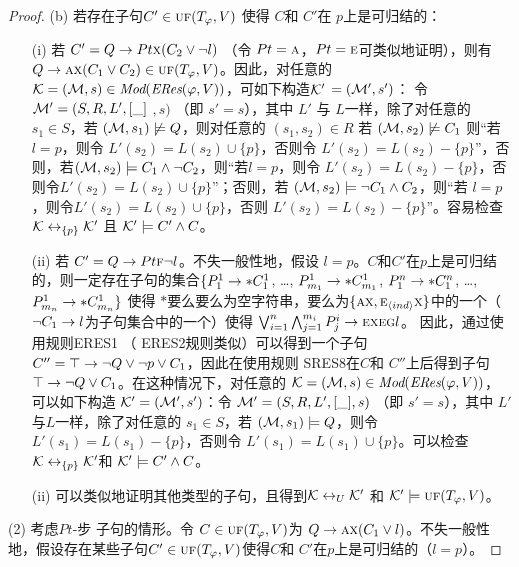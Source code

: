 \begin{proof}
	(b) 若存在子句$C'\in \textsc{uf}(T_\varphi,V)$ 使得 $C$和 $C'$在 $p$上是可归结的：
	\begin{itemize}
		\item[(i)] 若 $C'= Q\rightarrow Pt \textsc{x} (C_2 \vee \neg l)$ （令 $Pt=\textsc{a}$，$Pt = \textsc{e}$可类似地证明），则有$Q\rightarrow \textsc{a} \textsc{x}(C_1 \vee C_2) \in \textsc{uf}(T_\varphi,V)$。因此，对任意的 ${\cal K}=({\cal M}, s)\in \textit{Mod}(\emph{ERes}(\varphi,V))$，可如下构造${\cal K}'$ $=({\cal M}',s')$： 令 ${\cal M}'= (S, R, L',[\_]$ $,s)$ （即 $s'=s$），其中 $L'$ 与 $L$一样，除了对任意的 $s_1\in S$，若 $({\cal M}, s_1) \not \models Q$，则对任意的 $(s_1, s_2) \in R$ 若 $({\cal M}, s_2) \not \models C_1$ 则“若 $l=p$，则令 $L'(s_2) = L(s_2) \cup \{p\}$，否则令 $L'(s_2) = L(s_2) - \{p\}$”，否则，若$({\cal M}, s_2) \models  C_1 \wedge \neg C_2$，则“若$l=p$，则令 $L'(s_2) = L(s_2) - \{p\}$，否则令$L'(s_2) = L(s_2) \cup \{p\}$”；否则，若 $({\cal M}, s_2) \models \neg C_1 \wedge C_2$，则“若 $l=p$，则令$L'(s_2) = L(s_2) \cup \{p\}$，否则 $L'(s_2) = L(s_2) - \{p\}$”。容易检查 ${\cal K} \leftrightarrow_{\{p\}} {\cal K}'$ 且 ${\cal K}' \models C' \wedge C$。
		\item[(ii)] 若 $C' =  Q\rightarrow Pt \textsc{f} \neg l$。不失一般性地，假设 $l=p$。$C$和$C'$在$p$上是可归结的，则一定存在子句的集合$\{P_1^1 \rightarrow * C_1^1$, \dots, $P_{m_1}^1 \rightarrow * C_{m_1}^1$, $P_1^n \rightarrow * C_1^n$, \dots, $P_{m_n}^1 \rightarrow * C_{m_n}^1 \}$ 使得 $*$要么要么为空字符串，要么为$\{\textsc{a} \textsc{x}, \textsc{e}_{{\langle{ind}\rangle}} \textsc{x}\}$中的一个（$\neg C_1 \rightarrow l$为子句集合中的一个）使得 $\bigvee_{i=1}^n \bigwedge_{j=1}^{m_i} P_j^i \rightarrow \textsc{e} \textsc{x} \textsc{e} \textsc{g} l$。
		因此，通过使用规则ERES1 （ ERES2规则类似）可以得到一个子句 $C''=\top \rightarrow \neg Q \vee \neg p \vee C_1$，因此在使用规则 SRES8在$C$和 $C''$上后得到子句$\top \rightarrow \neg Q \vee C_1$。在这种情况下，对任意的 ${\cal K}=({\cal M}, s)\in \textit{Mod}(\emph{ERes}(\varphi,V))$，可以如下构造 ${\cal K}'=({\cal M}',s')$：令 ${\cal M}'= (S, R, L', [\_],s)$ （即 $s'=s$），其中 $L'$与$L$一样，除了对任意的 $s_1\in S$，若 $({\cal M}, s_1) \models Q$，则令 $L'(s_1) = L(s_1) - \{p\}$，否则令 $L'(s_1) = L(s_1) \cup \{p\}$。可以检查 ${\cal K} \leftrightarrow_{\{p\}} {\cal K}'$和 ${\cal K}' \models C' \wedge C$。
		\item[(ii)] 可以类似地证明其他类型的子句，且得到${\cal K} \leftrightarrow_{U} {\cal K}'$ 和 ${\cal K}' \models \textsc{uf}(T_\varphi,V)$。
	\end{itemize}
	
	(2) 考虑$Pt$-步 子句的情形。令 $C\in \textsc{uf}(T_\varphi,V)$为 $Q \rightarrow \textsc{a} \textsc{x}(C_1 \vee  l)$。不失一般性地，假设存在某些子句$C'\in \textsc{uf}(T_\varphi,V)$使得$C$和 $C'$在$p$上是可归结的（$l=p$）。
	

\end{proof}
